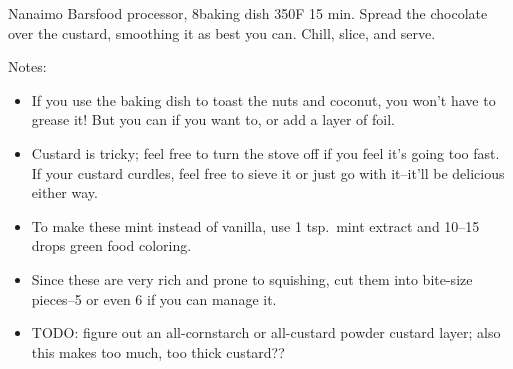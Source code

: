\begin{recipe}[Nanaimo]{Nanaimo Bars}{food processor, 8\inch{}\inch baking dish \hfill 350\0F \hfill 15 min.}
 \newstep Spread the chocolate over the custard, smoothing it as best you can. Chill, slice, and serve.

 \freeform Notes:
 \begin{itemize}
  \item  If you use the baking dish to toast the nuts and coconut, you won't have to grease it! But you can if you want to, or add a layer of foil.
  \item Custard is tricky; feel free to turn the stove off if you feel it's going too fast. If your custard curdles, feel free to sieve it or just go with it--it'll be delicious either way.
  \item To make these mint instead of vanilla, use 1 tsp.\ mint extract and 10--15 drops green food coloring.
  \item Since these are very rich and prone to squishing, cut them into bite-size pieces--5 or even 6 if you can manage it.
  \item TODO: figure out an all-cornstarch or all-custard powder custard layer; also this makes too much, too thick custard??
 \end{itemize}
\end{recipe}
